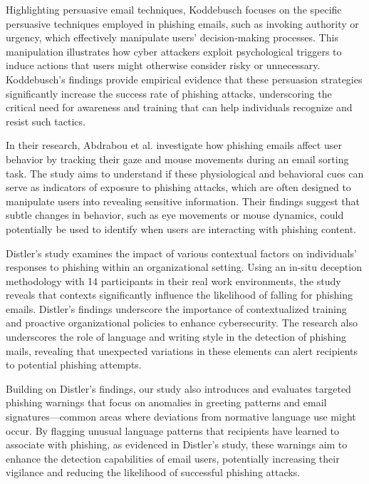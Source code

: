 \documentclass[
  a4paper,  %
  twoside,  %
  bibliography=totoc,
  headsepline,
  cleardoublepage=empty,
  parskip=half,
  draft=false
]{scrbook}
\begin{document}
Highlighting persuasive email techniques, Koddebusch \cite{koddebusch} focuses on the specific persuasive techniques employed in phishing emails, such as invoking authority or urgency, which effectively manipulate users' decision-making processes. This manipulation illustrates how cyber attackers exploit psychological triggers to induce actions that users might otherwise consider risky or unnecessary. Koddebusch's findings provide empirical evidence that these persuasion strategies significantly increase the success rate of phishing attacks, underscoring the critical need for awareness and training that can help individuals recognize and resist such tactics.

In their research, Abdrabou et al. \cite{abdrabou} investigate how phishing emails affect user behavior by tracking their gaze and mouse movements during an email sorting task. The study aims to understand if these physiological and behavioral cues can serve as indicators of exposure to phishing attacks, which are often designed to manipulate users into revealing sensitive information. Their findings suggest that subtle changes in behavior, such as eye movements or mouse dynamics, could potentially be used to identify when users are interacting with phishing content. 

Distler's study \cite{distler} examines the impact of various contextual factors on individuals' responses to phishing within an organizational setting. Using an in-situ deception methodology with 14 participants in their real work environments, the study reveals that contexts significantly influence the likelihood of falling for phishing emails. Distler's findings underscore the importance of contextualized training and proactive organizational policies to enhance cybersecurity.  The research also underscores the role of language and writing style in the detection of phishing mails, revealing that unexpected variations in these elements can alert recipients to potential phishing attempts. 

Building on Distler's findings, our study also introduces and evaluates targeted phishing warnings that focus on anomalies in greeting patterns and email signatures—common areas where deviations from normative language use might occur.  By flagging unusual language patterns that recipients have learned to associate with phishing, as evidenced in Distler’s study, these warnings aim to enhance the detection capabilities of email users, potentially increasing their vigilance and reducing the likelihood of successful phishing attacks. 
\end{document}
